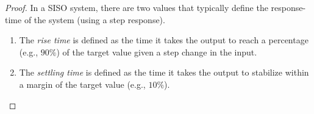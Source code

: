 \documentclass[sigconf]{llncs}
\begin{document}
\begin{proof}
In a SISO system, there are two values that typically define the
response-time of the system (using a step response).
%
\begin{enumerate}
%
\item The \emph{rise time} is defined as the time it takes the output to
reach a percentage (e.g., $90\%$) of the target value given a step change in
the input.
%
\item The \emph{settling time} is defined as the time it takes the output to
stabilize within a margin of the target value (e.g., $10\%$).
%
\end{enumerate} 
%


\end{proof}
\end{document}
